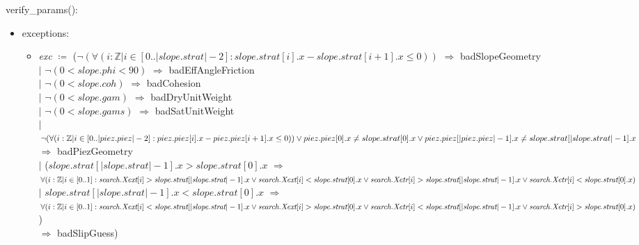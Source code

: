 \documentclass[12pt, titlepage]{article}
\begin{document}
\noindent verify\_params():
\begin{itemize}
	\item exceptions:
	\begin{itemize}
		\item[] \textit{exc} $\coloneqq$ ($\lnot (\forall(i : \mathbb{Z} | i 
		\in [0..|slope.strat|-2] : slope.strat[i].x - slope.strat[i+1].x \leq 
		0))$ $\Rightarrow$ badSlopeGeometry\\
		$|$ $\lnot (0 < slope.phi < 90)$ $\Rightarrow$ 
		badEffAngleFriction\\
		$|$ $\lnot (0 < slope.coh)$ $\Rightarrow$ 
		badCohesion\\
		$|$ $\lnot (0 < slope.gam)$ $\Rightarrow$ 
		badDryUnitWeight\\
		$|$ $\lnot (0 < slope.gams)$ $\Rightarrow$ 
		badSatUnitWeight\\
		$|$ $\lnot (\forall(i : \mathbb{Z} | i \in 
		[0..|piez.piez|-2] : piez.piez[i].x - piez.piez[i+1].x \leq 0))\\ 
		\lor piez.piez[0].x \neq slope.strat[0].x \\
		\lor piez.piez[|piez.piez|-1].x \neq slope.strat[|slope.strat|-1].x$\\ 
		$\Rightarrow$ badPiezGeometry\\
		$|$ ($\textit{slope.strat}[|\textit{slope.strat}|-1].x > 
		\textit{slope.strat}[0].x$ $\Rightarrow$ $\forall(i : \mathbb{Z} | i 
		\in [0..1] :\\
		\textit{search.Xext}[i] > 
		\textit{slope.strat}[|\textit{slope.strat}|-1].x \\
		\lor \textit{search.Xext}[i] < \textit{slope.strat}[0].x \\
		\lor \textit{search.Xetr}[i] >  
		\textit{slope.strat}[|\textit{slope.strat}|-1].x\\
		\lor \textit{search.Xetr}[i] < \textit{slope.strat}[0].x)$\\
		$|$ $\textit{slope.strat}[|\textit{slope.strat}|-1].x < 
		\textit{slope.strat}[0].x$ $\Rightarrow$ $\forall(i : \mathbb{Z} | i 
		\in [0..1] : \\
		\textit{search.Xext}[i] < 
		\textit{slope.strat}[|\textit{slope.strat}|-1].x \\
		\lor \textit{search.Xext}[i] > \textit{slope.strat}[0].x \\
		\lor \textit{search.Xetr}[i] < 
		\textit{slope.strat}[|\textit{slope.strat}|-1].x \\
		\lor \textit{search.Xetr}[i] > \textit{slope.strat}[0].x)$)\\ 
		$\Rightarrow$ badSlipGuess)\\
	\end{itemize}
\end{itemize}
\end{document}
